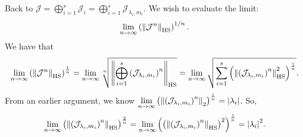 \documentclass[11pt]{article}
\begin{document}
\noindent Back to $\mathcal{J} = \bigoplus_{i=1}^s \mathcal{J}_i = \bigoplus_{i=1}^s \mathcal{J}_{\lambda_i,m_i}$. We wish to evaluate the limit:
\begin{align*}
\lim_{n\to \infty} \left(\norm{\mathcal{J}^n}_{\text{HS}}\right)^{1/n}.
\end{align*}
We have that
\begin{align*}
\lim\limits_{n\to\infty}\left( \norm{\mathcal{J}^n}_\text{HS} \right)^{\frac{1}{n}} =  \lim\limits_{n\to\infty}\sqrt[n]{ \norm{\bigoplus^{s}_{i=1}\left( \mathcal{J}_{\lambda_i, m_i}\right)^n}_\text{HS}}= \lim\limits_{n\to\infty}\sqrt{  \sum^{s}_{i=1}\left( \norm{\left( \mathcal{J}_{\lambda_i, m_i}\right)^n}_\text{HS}^2 \right)^\frac{1}{n}}.
\end{align*}
From an earlier argument, we know  
$ \lim\limits_{n\to\infty} \left(  \norm{\left(\mathcal{J}_{\lambda_i,m_i}\right)^n}_2 \right)^{\frac{1}{n}}  =  \abs{\lambda_i}$. So,
\begin{align*}
\lim\limits_{n\to\infty} \left(  \norm{\left(\mathcal{J}_{\lambda_i,m_i}\right)^n}_\text{HS} \right)^{\frac{2}{n}}  = \lim\limits_{n\to\infty} \left(\left(  \norm{\left(\mathcal{J}_{\lambda_i,m_i}\right)^n}_\text{HS} \right)^2\right)^{\frac{1}{n}}  =   \abs{\lambda_i}^2.
\end{align*}
\end{document}
